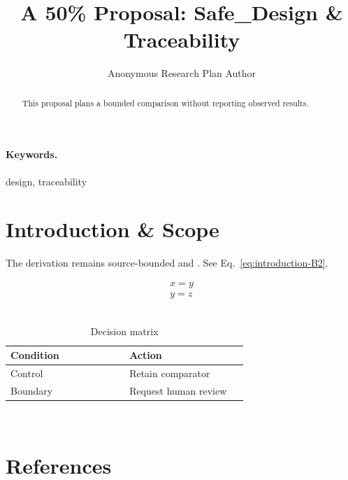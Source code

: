 \documentclass{article}
\title{A 50\% Proposal: Safe\_Design \& Traceability}
\author{Anonymous Research Plan Author}
\begin{document}
\maketitle
\begin{abstract}
This proposal plans a bounded comparison without reporting observed results.
\end{abstract}
\paragraph{Keywords.} design, traceability
\section{Introduction \& Scope}
The derivation remains source-bounded and . See Eq.~\eqref{eq:introduction-B2}.~\cite{cite_example_1}

\begin{align}
x = y \nonumber \\
y = z \label{eq:introduction-B2}
\end{align}~\cite{cite_example_1}

\begin{table}[htbp]
\centering
\small


\caption{Decision matrix}
\label{tab:introduction-B3}
\begin{tabular}{|p{0.45\linewidth}|p{0.45\linewidth}|}
\hline
Condition & Action \\\hline
Control & Retain comparator \\\hline
Boundary & Request human review \\\hline
\end{tabular}
\end{table}~\cite{cite_example_1}
\section*{References}


\end{document}
